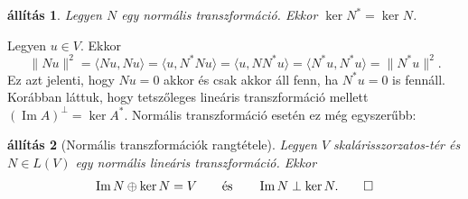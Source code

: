 \documentclass[a4paper, showtrims]{memoir}
\makeatletter
\renewenvironment{proof}[1][\proofname]
    {\par\pushQED{\qed}%
    \normalfont \topsep6\p@\@plus6\p@\relax
    \trivlist
    \item[\hskip\labelsep
        \itshape
    #1\@addpunct{:}]\ignorespaces}
    {\popQED\endtrivlist\@endpefalse}
\theoremstyle{plain}
\newtheorem{proposition}{állítás}[chapter]
\theoremstyle{remark}
\theoremstyle{definition}
\DeclareMathOperator{\im}{Im}
\newcommand{\ip}[2]{\langle#1,#2\rangle}
\makeatother
\begin{document}
\begin{proposition}
	Legyen $N$ egy normális transzformáció.
	Ekkor $\ker N^\ast=\ker N$.
\end{proposition}
\begin{proof}
	Legyen $u\in V.$
	Ekkor
	\[
		\|Nu\|^2
		=
		\ip{Nu}{Nu}
		=
		\ip{u}{N^\ast Nu}
		=
		\ip{u}{NN^\ast u}
		=
		\ip{N^\ast u}{N^\ast u}
		=
		\|N^\ast u\|^2.
	\]
	Ez azt jelenti, hogy $Nu=0$ akkor és csak akkor áll fenn,
	ha $N^\ast u = 0$ is fennáll.
\end{proof}
Korábban láttuk,
hogy tetszőleges lineáris transzformáció mellett $(\im A)^\perp=\ker A^\ast.$
Normális transzformáció esetén ez még egyszerűbb:
\begin{proposition}[Normális transzformációk rangtétele]\label{pr:normalisrang}
	Legyen $V$ skalárisszorzatos-tér és $N\in L\left( V \right)$ egy normális lineáris transzformáció.
	Ekkor
	\[
		\im N\oplus\ker N=V\qquad\text{és}\qquad \im N\perp \ker N.
		\qedhere
	\]
\end{proposition}
\end{document}
